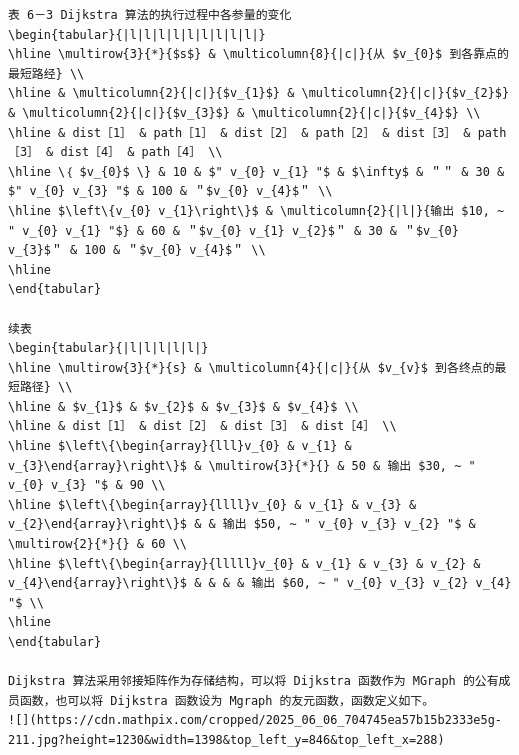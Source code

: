 \documentclass[10pt]{article}
\begin{document}
\begin{verbatim}
表 6－3 Dijkstra 算法的执行过程中各参量的变化
\begin{tabular}{|l|l|l|l|l|l|l|l|l|}
\hline \multirow{3}{*}{$s$} & \multicolumn{8}{|c|}{从 $v_{0}$ 到各靠点的最短路经} \\
\hline & \multicolumn{2}{|c|}{$v_{1}$} & \multicolumn{2}{|c|}{$v_{2}$} & \multicolumn{2}{|c|}{$v_{3}$} & \multicolumn{2}{|c|}{$v_{4}$} \\
\hline & dist［1］ & path［1］ & dist［2］ & path［2］ & dist［3］ & path［3］ & dist［4］ & path［4］ \\
\hline \｛ $v_{0}$ \} & 10 & $" v_{0} v_{1} "$ & $\infty$ & ＂＂ & 30 & $" v_{0} v_{3} "$ & 100 & ＂$v_{0} v_{4}$＂ \\
\hline $\left\{v_{0} v_{1}\right\}$ & \multicolumn{2}{|l|}{输出 $10, ~ " v_{0} v_{1} "$} & 60 & ＂$v_{0} v_{1} v_{2}$＂ & 30 & ＂$v_{0} v_{3}$＂ & 100 & ＂$v_{0} v_{4}$＂ \\
\hline
\end{tabular}

续表
\begin{tabular}{|l|l|l|l|l|}
\hline \multirow{3}{*}{s} & \multicolumn{4}{|c|}{从 $v_{v}$ 到各终点的最短路径} \\
\hline & $v_{1}$ & $v_{2}$ & $v_{3}$ & $v_{4}$ \\
\hline & dist［1］ & dist［2］ & dist［3］ & dist［4］ \\
\hline $\left\{\begin{array}{lll}v_{0} & v_{1} & v_{3}\end{array}\right\}$ & \multirow{3}{*}{} & 50 & 输出 $30, ~ " v_{0} v_{3} "$ & 90 \\
\hline $\left\{\begin{array}{llll}v_{0} & v_{1} & v_{3} & v_{2}\end{array}\right\}$ & & 输出 $50, ~ " v_{0} v_{3} v_{2} "$ & \multirow{2}{*}{} & 60 \\
\hline $\left\{\begin{array}{lllll}v_{0} & v_{1} & v_{3} & v_{2} & v_{4}\end{array}\right\}$ & & & & 输出 $60, ~ " v_{0} v_{3} v_{2} v_{4} "$ \\
\hline
\end{tabular}

Dijkstra 算法采用邻接矩阵作为存储结构，可以将 Dijkstra 函数作为 MGraph 的公有成员函数，也可以将 Dijkstra 函数设为 Mgraph 的友元函数，函数定义如下。
![](https://cdn.mathpix.com/cropped/2025_06_06_704745ea57b15b2333e5g-211.jpg?height=1230&width=1398&top_left_y=846&top_left_x=288)


\end{verbatim}
\end{document}
